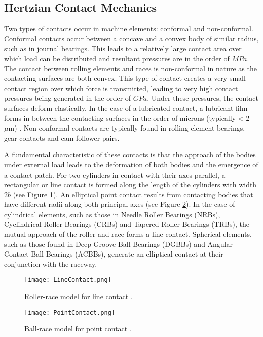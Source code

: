 \subsection{Hertzian Contact Mechanics}

Two types of contacts occur in machine elements: conformal and non-conformal. Conformal contacts occur between a concave and a convex body of similar radius, such as in journal bearings. This leads to a relatively large contact area over which load can be distributed and resultant pressures are in the order of $MPa$. The contact between rolling elements and races is non-conformal in nature as the contacting surfaces are both convex. This type of contact creates a very small contact region over which force is transmitted, leading to very high contact pressures being generated in the order of $GPa$. Under these pressures, the contact surfaces deform elastically. In the case of a lubricated contact, a lubricant film forms in between the contacting surfaces in the order of microns (typically < 2~$\mu \mathrm{m}$) \cite{Gohar2018}. Non-conformal contacts are typically found in rolling element bearings, gear contacts and cam follower pairs.

A fundamental characteristic of these contacts is that the approach of the bodies under external load leads to the deformation of both bodies and the emergence of a contact patch. For two cylinders in contact with their axes parallel, a rectangular or line contact is formed along the length of the cylinders with width $2b$ (see Figure \ref{LineContact}). An elliptical point contact results from contacting bodies that have different radii along both principal axes \cite{Johnson1985} (see Figure \ref{PointContact}). In the case of cylindrical elements, such as those in Needle Roller Bearings (NRBs), Cyclindrical Roller Bearings (CRBs) and Tapered Roller Bearings (TRBs), the mutual approach of the roller and race forms a line contact. Spherical elements, such as those found in Deep Groove Ball Bearings (DGBBs) and Angular Contact Ball Bearings (ACBBs), generate an elliptical contact at their conjunction with the raceway.

\begin{figure}
	\centerline{\texttt{[image: LineContact.png]}}
	\caption[Roller-race model for line contact]{Roller-race model for line contact \cite{Zaretsky2016}.}
	\label{LineContact}
\end{figure}

\begin{figure}
	\centerline{\texttt{[image: PointContact.png]}}
	\caption[Ball-race model for point contact]{Ball-race model for point contact \cite{Zaretsky2016}.}
	\label{PointContact}
\end{figure}

